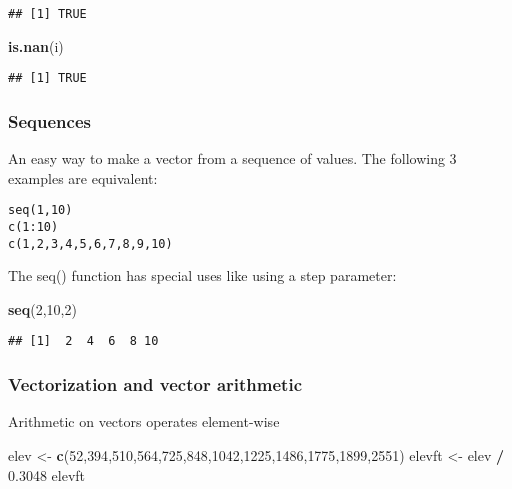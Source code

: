 \documentclass[
]{book}
\newenvironment{Shaded}{\begin{snugshade}}{\end{snugshade}}
\newcommand{\DecValTok}[1]{\textcolor[rgb]{0.00,0.00,0.81}{#1}}
\newcommand{\FloatTok}[1]{\textcolor[rgb]{0.00,0.00,0.81}{#1}}
\newcommand{\KeywordTok}[1]{\textcolor[rgb]{0.13,0.29,0.53}{\textbf{#1}}}
\newcommand{\NormalTok}[1]{#1}
\newcommand{\OperatorTok}[1]{\textcolor[rgb]{0.81,0.36,0.00}{\textbf{#1}}}
\newcommand{\StringTok}[1]{\textcolor[rgb]{0.31,0.60,0.02}{#1}}
\begin{document}
\begin{verbatim}
## [1] TRUE
\end{verbatim}

\begin{Shaded}
\begin{Highlighting}[]
\KeywordTok{is.nan}\NormalTok{(i)}
\end{Highlighting}
\end{Shaded}

\begin{verbatim}
## [1] TRUE
\end{verbatim}

\hypertarget{sequences}{%
\subsubsection{Sequences}\label{sequences}}

An easy way to make a vector from a sequence of values. The following 3 examples are equivalent:

\begin{verbatim}
seq(1,10)
c(1:10)
c(1,2,3,4,5,6,7,8,9,10)
\end{verbatim}

The seq() function has special uses like using a step parameter:

\begin{Shaded}
\begin{Highlighting}[]
\KeywordTok{seq}\NormalTok{(}\DecValTok{2}\NormalTok{,}\DecValTok{10}\NormalTok{,}\DecValTok{2}\NormalTok{)}
\end{Highlighting}
\end{Shaded}

\begin{verbatim}
## [1]  2  4  6  8 10
\end{verbatim}

\hypertarget{vectorization-and-vector-arithmetic}{%
\subsubsection{Vectorization and vector arithmetic}\label{vectorization-and-vector-arithmetic}}

Arithmetic on vectors operates element-wise

\begin{Shaded}
\begin{Highlighting}[]
\NormalTok{elev <-}\StringTok{ }\KeywordTok{c}\NormalTok{(}\DecValTok{52}\NormalTok{,}\DecValTok{394}\NormalTok{,}\DecValTok{510}\NormalTok{,}\DecValTok{564}\NormalTok{,}\DecValTok{725}\NormalTok{,}\DecValTok{848}\NormalTok{,}\DecValTok{1042}\NormalTok{,}\DecValTok{1225}\NormalTok{,}\DecValTok{1486}\NormalTok{,}\DecValTok{1775}\NormalTok{,}\DecValTok{1899}\NormalTok{,}\DecValTok{2551}\NormalTok{)}
\NormalTok{elevft <-}\StringTok{ }\NormalTok{elev }\OperatorTok{/}\StringTok{ }\FloatTok{0.3048}
\NormalTok{elevft}
\end{Highlighting}
\end{Shaded}
\end{document}
